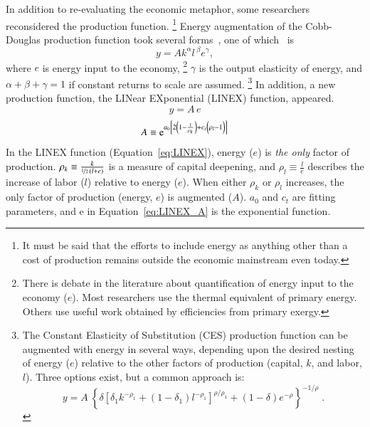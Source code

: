 In addition to re-evaluating the economic metaphor,
some researchers reconsidered the production function.%
	\footnote{
	It must be said that the efforts to include energy 
	as anything other than a cost of production 
	remains outside the economic mainstream even today.
	}
Energy augmentation of the Cobb-Douglas production function
took several forms~\cite[Equation~1]{Kavrakoglu:1983vi}, 
one of which~\cite[Equation~3.10]{Kummel:1985vz} is 
%
\begin{equation} \label{eq:cobb-douglas_with_energy}
	y = A k^{\alpha} l \, ^\beta e^{\gamma} ,
\end{equation}	 
%
where $e$ is energy input to the economy,%
	\footnote{
	There is debate in the literature about quantification of 
	energy input to the economy ($e$).
	Most researchers use the thermal equivalent 
	of primary energy.\cite{Cleveland:1984aa, Froling:2009vo, Stern:2012ey, Nel:2010fv}
	Others use useful work obtained by efficiencies from primary exergy.\cite{Ayres:2010ug}
	}
$\gamma$ is the output elasticity of energy, and 
$\alpha + \beta + \gamma = 1$ if constant returns to scale are assumed.%
	\footnote{
	The Constant Elasticity of Substitution (CES) production function
	can be augmented with energy in several ways, 
	depending upon the desired nesting of energy ($e$) relative to the other
	factors of production 
	(capital, $k$, and labor, $l$).\cite{rath1981energy, Zwaan:2002aa}
	Three options exist, but a common approach is:
	\begin{equation*}
		y = A \: \left\{\delta \left[\delta_1 k^{-\rho_1} 
		    + (1-\delta_1)l^{-\rho_1} \right]^{\rho/\rho_1} 
		    + (1-\delta) e^{-\rho} \right\}^{-1/\rho} \; .
	\end{equation*}
	}
In addition, a new production function, 
the LINear EXponential (LINEX) function, 
appeared.\cite{Ayres:2010ug, Kummel:1980wx, Kummel:1982vy}
%
\begin{equation} \label{eq:LINEX}
  y = A \, e
\end{equation}
%
\begin{equation} \label{eq:LINEX_A}
  A \equiv \mathrm{e}^{a_0\left[2 \left(1 - \frac{1}{\rho_k} \right) 
    + c_t \left(\vphantom{\frac{1}{\rho_k}}\rho_l - 1 \right)\right]}
\end{equation}
%
In the LINEX function (Equation~\ref{eq:LINEX}), 
energy ($e$) is \emph{the only} factor of production.
$\rho_k \equiv \frac{k}{\nicefrac{1}{2} \, (l+e)}$ is a measure of capital deepening,
and $\rho_l \equiv \frac{l}{e}$ describes the increase of labor ($l$)
relative to energy ($e$).
When either $\rho_k$ or $\rho_l$ increases, 
the only factor of production (energy, $e$) is augmented ($A$).
$a_0$ and $c_t$ are fitting parameters, and
e in Equation~\ref{eq:LINEX_A} is the exponential function.

